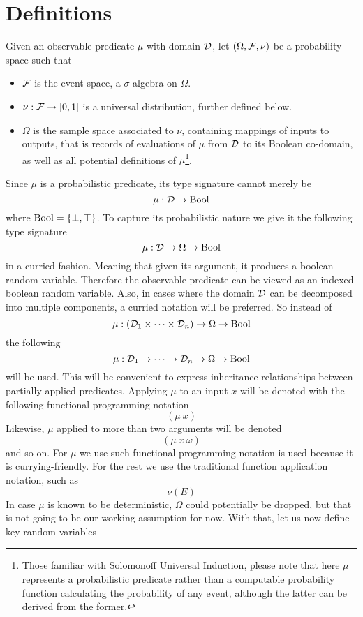 \documentclass[]{article}
\begin{document}
\section{Definitions}
Given an observable predicate $\mu$ with domain $\mathcal{D}$, let
$(\Omega, \mathcal{F}, \nu)$ be a probability space such that
\begin{itemize}
\item $\mathcal{F}$ is the event space, a $\sigma$-algebra on $\Omega$.
\item $\nu : \mathcal{F} \to [0, 1]$ is a universal distribution, further
  defined below.
\item $\Omega$ is the sample space associated to $\nu$, containing
  mappings of inputs to outputs, that is records of evaluations of
  $\mu$ from $\mathcal{D}$ to its Boolean co-domain, as well as all
  potential definitions of $\mu$\footnote{Those familiar with
  Solomonoff Universal Induction, please note that here $\mu$
  represents a probabilistic predicate rather than a computable
  probability function calculating the probability of any event,
  although the latter can be derived from the former.}.
\end{itemize}
Since $\mu$ is a probabilistic predicate, its type signature cannot
merely be
$$\mu : \mathcal{D} \to \textup{Bool}$$ where $\textup{Bool} = \{\bot, \top\}$.  To capture
its probabilistic nature we give it the following type signature
$$\mu : \mathcal{D} \to \Omega \to \textup{Bool}$$ in a curried fashion.  Meaning
that given its argument, it produces a boolean random variable.
Therefore the observable predicate can be viewed as an indexed boolean
random variable.  Also, in cases where the domain $\mathcal{D}$ can be
decomposed into multiple components, a curried notation will be
preferred.  So instead of
$$\mu : (\mathcal{D}_1 \times \dots \times \mathcal{D}_n) \to \Omega \to \textup{Bool}$$
the following
$$\mu : \mathcal{D}_1 \to \dots \to \mathcal{D}_n \to \Omega \to \textup{Bool}$$ will
be used.  This will be convenient to express inheritance relationships
between partially applied predicates.  Applying $\mu$ to an input $x$
will be denoted with the following functional programming notation
$$(\mu\ x)$$ Likewise, $\mu$ applied to more than two arguments will
be denoted
$$(\mu\ x\ \omega)$$ and so on.  For $\mu$ we use such functional
programming notation is used because it is currying-friendly.  For the
rest we use the traditional function application notation, such as
$$\nu(E)$$ In case $\mu$ is known to be deterministic, $\Omega$ could
potentially be dropped, but that is not going to be our working
assumption for now.  With that, let us now define key random variables
\end{document}
